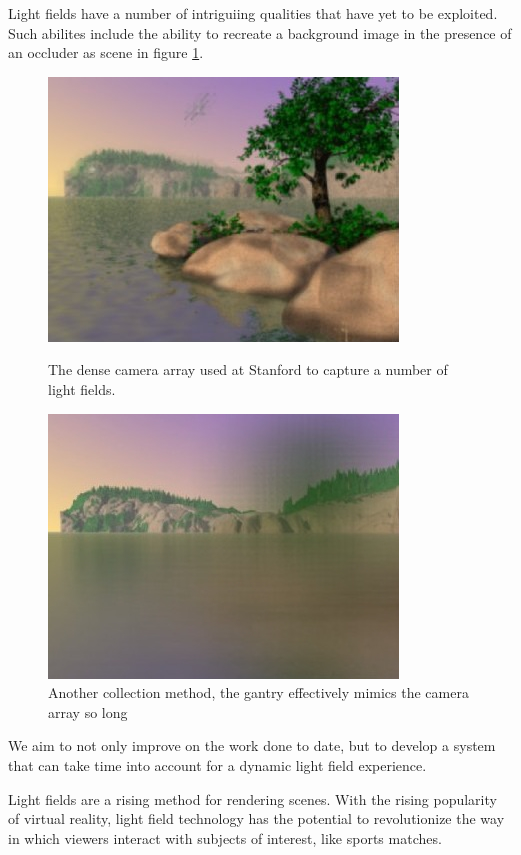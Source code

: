 \documentclass[12pt]{report}
\begin{document}
Light fields have a number of intriguiing qualities that have yet to be exploited. Such abilites include the ability to recreate a background image in the presence of an occluder as scene in figure \ref{fig:seethrough_occluder}. 
\begin{figure}[!ht]
	\centering
	\begin{minipage}{0.45\textwidth}
		\centering
		\includegraphics[scale=0.55]{seethrough_occluder.png}
		\caption{The dense camera array used at Stanford to capture a number of light fields.}
		\label{fig:camera_array}
	\end{minipage}\hfill
	\begin{minipage}{0.45\textwidth}
		\centering
		\includegraphics[scale=0.55]{seethrough_occluder2.png}
		\caption{Another collection method, the gantry effectively mimics the camera array so long}
		\label{fig:seethrough_occluder}
	\end{minipage}
\end{figure}

We aim to not only improve on the work done to date, but to develop a system that can take time into account for a dynamic light field experience. 

Light fields are a rising method for rendering scenes. With the rising popularity of virtual reality, light field technology has the potential to revolutionize the way in which viewers interact with subjects of interest, like sports matches.
\end{document}
